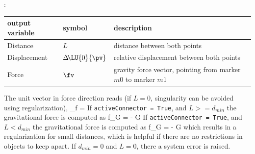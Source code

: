 :
\begin{center}
\footnotesize
\begin{longtable}{| p{5cm} | p{5cm} | p{6cm} |} 
\hline
\bf output variable & \bf symbol & \bf description \\ \hline
Distance & $L$ & distance between both points\\ \hline
Displacement & $\Delta\! \LU{0}{\pv}$ & relative displacement between both points\\ \hline
Force & $\fv$ & gravity force vector, pointing from marker $m0$ to marker $m1$\\ \hline
\end{longtable}
\end{center}
 \noindent
    \finishTable
    \finishTable
    The unit vector in force direction reads (if $L=0$, singularity can be avoided using regularization),
    \be
      \vv_{f} =  \Delta\! 
    \ee
    If \texttt{activeConnector = True}, and $L>=d_{min}$ the gravitational force is computed as
    \be
      f_G = - G 
    \ee
    If \texttt{activeConnector = True}, and $L<d_{min}$ the gravitational force is computed as
    \be
      f_G = - G 
    \ee
    which results in a regularization for small distances, which is helpful if there are no restrictions in objects to keep apart.
    If $d_{min}=0$ and $L=0$, there a system error is raised.
    
